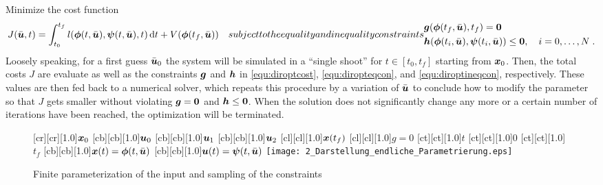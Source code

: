 Minimize the cost function
\begin{subequations}
\begin{align}
J(\bar{\bs{u}},t) = 
	\int_{t_0}^{t_f} l(\bs{\phi}(t,\bar{\bs{u}}),\bs{\psi}(t,\bar{\bs{u}}),t)\,{\rm d} t + V(\bs{\phi}(t_f,\bar{\bs{u}}))
\label{equ:diroptcost}
\end{align}
\quad subject to the equality and inequality constraints
\begin{align}
	 &\bs{g}(\bs{\phi}(t_f,\bar{\bs{u}}),t_f) = \bs{0} \label{equ:diropteqcon}\\ 	
	&\bs{h}(\bs{\phi}(t_i,\bar{\bs{u}}),\bs{\psi}(t_i,\bar{\bs{u}}))  \leq \bs{0},  \quad  i=0,\ldots,N \label{equ:diroptineqcon}\;. 
\end{align} 
\end{subequations}
Loosely speaking, for a first guess $\bar{\boldsymbol{u}}_0$ the system will be simulated in a “single shoot” for $t \in [t_0,t_f]$  starting from $\boldsymbol{x}_0$. Then, the total costs $J$ are evaluate as well as the constraints $\boldsymbol{g}$ and $\boldsymbol{h}$ in \eqref{equ:diroptcost}, \eqref{equ:diropteqcon}, and \eqref{equ:diroptineqcon}, respectively. These values are then fed back to a numerical solver, which repeats this procedure by a variation of $\bar{\boldsymbol{u}}$ to conclude how to modify the parameter so that $J$ gets smaller without violating $\boldsymbol{g}=\boldsymbol{0}$ and $\boldsymbol{h}\leq\boldsymbol{0}$. When the solution does not significantly change any more or a certain number of iterations have been reached, the optimization will be terminated.



\begin{figure}[h]
\centering
	[cr][cr][1.0]{$\boldsymbol{x}_0$}
	[cb][cb][1.0]{$\boldsymbol{u}_0$}
	[cb][cb][1.0]{$\boldsymbol{u}_1$}
	[cb][cb][1.0]{$\boldsymbol{u}_2$}
	[cl][cl][1.0]{$\boldsymbol{x}(t_f)$}
	[cl][cl][1.0]{$g=0$}
	[ct][ct][1.0]{$t$}
	[ct][ct][1.0]{$0$}
	[ct][ct][1.0]{$t_f$}
	[cb][cb][1.0]{$\boldsymbol{x}(t) = \boldsymbol{\phi}(t,\bar{\boldsymbol{u}})$}
	[cb][cb][1.0]{$\boldsymbol{u}(t) = \boldsymbol{\psi}(t,\bar{\boldsymbol{u}})$}
 \texttt{[image: 2\_Darstellung\_endliche\_Parametrierung.eps]}
	\caption[Finite parameterization of the input]{Finite parameterization of the input and sampling of the constraints \cite{papageorgiou2012optimierung}} 
	\label{fig:parametrisierte_nmpc}
\end{figure}


